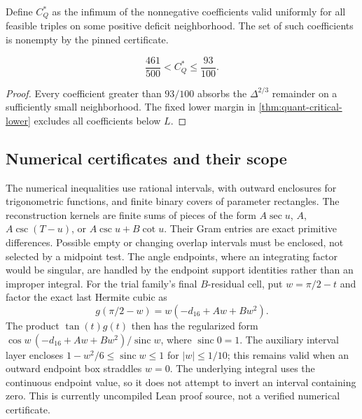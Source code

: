 Define $C_Q^*$ as the infimum of the nonnegative coefficients valid uniformly
for all feasible triples on some positive deficit neighborhood. The set of
such coefficients is nonempty by the pinned certificate.
\begin{corollary}\label{cor:quant-intrinsic-interval}
\[
 \frac{461}{500}<C_Q^*\le\frac{93}{100}.
\]
\end{corollary}
\begin{proof}
Every coefficient greater than $93/100$ absorbs the $\Delta^{2/3}$
remainder on a sufficiently small neighborhood. The fixed lower margin
in \cref{thm:quant-critical-lower} excludes all coefficients below $L$.
\end{proof}


\subsection{Numerical certificates and their scope}
\label{sec:quant-certificates}

The numerical inequalities use rational intervals, with outward enclosures
for trigonometric functions, and finite binary covers of parameter rectangles.
The reconstruction kernels are finite sums of pieces of the form
$A\sec u$, $A$, $A\csc(T-u)$, or $A\csc u+B\cot u$.
Their Gram entries are exact primitive differences. Possible empty or changing
overlap intervals must be enclosed, not selected by a midpoint test.
The angle endpoints, where an integrating factor would be singular, are
handled by the endpoint support identities rather than an improper integral.
For the trial family's final $B$-residual cell, put $w=\pi/2-t$ and factor
the exact last Hermite cubic as
\[
 g(\pi/2-w)=w(-d_{16}+Aw+Bw^2).
\]
The product $\tan(t)g(t)$ then has the regularized form
$\cos w\,(-d_{16}+Aw+Bw^2)/\operatorname{sinc}w$, where
$\operatorname{sinc}0=1$. The auxiliary interval layer encloses
$1-w^2/6\le\operatorname{sinc}w\le1$ for $|w|\le1/10$;
this remains valid when an outward endpoint box straddles $w=0$.
The underlying integral uses the continuous endpoint value, so it does
not attempt to invert an interval containing zero. This is currently
uncompiled Lean proof source, not a verified numerical certificate.

